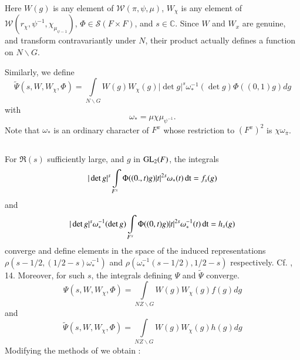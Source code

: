 Here $W(g)$ is any element of $\mathscr{W}(\pi,\psi,\mu)$, $W_{\chi}$ is any element of $\mathscr{W}(r_{\chi},\psi^{-1},\chi_{\mu_{\psi-1}})$, $\Phi\in \mathscr{S}(F\times F)$, and $s\in \mathbb{C}$. Since $W$ and $W_{x}$ are genuine, and transform contravariantly under $N$, their product actually defines a function on $N\backslash G$.

Similarly, we define
\begin{equation}
\widetilde{\Psi}(s,W,W_{\chi},\Phi)=\int\limits_{N\backslash G}W(g)W_{\chi}(g)|\det g|^{s}\omega^{-1}_{*}(\det g)\Phi((0,1)g)dg\label{art1-eq5.1.2}
\end{equation}
with 
\begin{equation}
\omega_{*}=\mu \chi \mu_{\psi^{-1}}.\label{art1-eq5.1.3}
\end{equation}
Note that $\omega_{*}$ is an ordinary character of $F^{x}$ whose restriction to $(F^{x})^{2}$ is $\chi \omega_{\overline{\pi}}$.

\subsection{}\label{art1-sec5.2}\pageoriginale
For $\Re(s)$ sufficiently large, and $g$ in $\mathrm{GL}_{2}(F)$, the integrals
\setcounter{equation}{0}
\begin{equation}
|\det g|^{s}\int\limits_{F^{x}}\Phi ((0.,t)g)|t|^{2s}\omega_{*}(t)\operatorname{dt}=f_{s}(g)\label{art1-eq5.2.1}
\end{equation}
and
\begin{equation}
|\det g|^{s}\omega^{-1}_{*}(\det g)\int\limits_{F^{x}}\Phi((0,t)g)|t|^{2s}\omega^{-1}_{*}(t)\operatorname{dt} = h_{s}(g)\label{art1-eq5.2.2}
\end{equation}
converge and define elements in the space of the induced representations $\rho(s-1/2, (1/2-s)\omega^{-1}_{*})$ and $\rho(\omega^{-1}_{*}(s-1/2),1/2-s)$ respectively. Cf. \cite{Ja}, 14. Moreover, for such $s$, the integrals defining $\Psi$ and $\widetilde{\Psi}$ converge.
\begin{equation}
\Psi(s,W,W_{\chi},\Phi)=\int\limits_{NZ\backslash G}W(g)W_{\chi}(g)f(g)dg\label{art1-eq5.2.3}
\end{equation}
and
$$
\widetilde{\Psi}(s,W,W_{\chi},\Phi)=\int\limits_{NZ\backslash G}W(g)W_{\chi}(g)h(g)dg
$$
Modifying the methods of \cite{Ja} we obtain :

